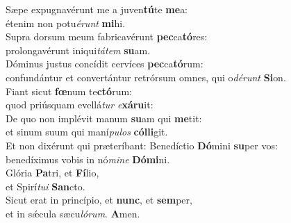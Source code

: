 \evenverse Sæpe expugnavérunt me a juven\textbf{tú}te \textbf{me}a:~\*\\
\evenverse étenim non potu\textit{é}\textit{runt} \textbf{mi}hi.\\
\oddverse Supra dorsum meum fabricavérunt \textbf{pec}ca\textbf{tó}res:~\*\\
\oddverse prolongavérunt iniqui\textit{tá}\textit{tem} \textbf{su}am.\\
\evenverse Dóminus justus concídit cervíces \textbf{pec}ca\textbf{tó}rum:~\*\\
\evenverse confundántur et convertántur retrórsum omnes, qui o\textit{dé}\textit{runt} \textbf{Si}on.\\
\oddverse Fiant sicut \textbf{fœ}num te\textbf{ctó}rum:~\*\\
\oddverse quod priúsquam evellá\textit{tur} \textit{e}\textbf{xá}\textbf{ru}it:\\
\evenverse De quo non implévit manum \textbf{su}am qui \textbf{me}tit:~\*\\
\evenverse et sinum suum qui maní\textit{pu}\textit{los} \textbf{cól}\textbf{li}git.\\
\oddverse Et non dixérunt qui præteríbant: Benedíctio \textbf{Dó}mini \textbf{su}per vos:~\*\\
\oddverse benedíximus vobis in nó\textit{mi}\textit{ne} \textbf{Dó}\textbf{mi}ni.\\
\evenverse Glória \textbf{Pa}tri, et \textbf{Fí}lio,~\*\\
\evenverse et Spirí\textit{tu}\textit{i} \textbf{San}cto.\\
\oddverse Sicut erat in princípio, et \textbf{nunc}, et \textbf{sem}per,~\*\\
\oddverse et in sǽcula sæcu\textit{ló}\textit{rum}. \textbf{A}men.\\
